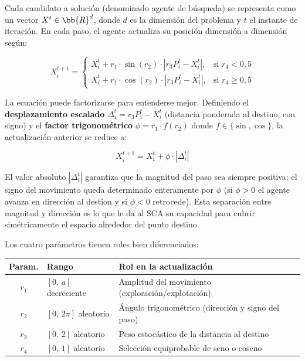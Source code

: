 \documentclass[12pt,a4paper]{article}
\begin{document}
Cada candidato a solución (denominado agente de búsqueda) se representa como un vector $X^t \in \bb{R}^d$, donde $d$ es la dimensión del problema y $t$ el instante de iteración. En cada paso, el agente actualiza su posición {dimensión a dimensión} según:

\begin{equation}
X_i^{t+1} =
\begin{cases}
X_i^t + r_1 \cdot \sin(r_2) \cdot \left| r_3 P_i^t - X_i^t \right|, & \text{si } r_4 < 0{,}5 \\[6pt]
X_i^t + r_1 \cdot \cos(r_2) \cdot \left| r_3 P_i^t - X_i^t \right|, & \text{si } r_4 \geq 0{,}5
\end{cases}
\label{eq:update}
\end{equation}

La ecuación puede factorizarse para entenderse mejor. Definiendo el \textbf{desplazamiento escalado} $\Delta_i^t = r_3 P_i^t - X_i^t$ (distancia ponderada al destino, con signo) y el \textbf{factor trigonométrico} $\phi = r_1 \cdot f(r_2)$ donde $f \in \{\sin, \cos\}$, la actualización anterior se reduce a:

\begin{equation}
X_i^{t+1} = X_i^t + \phi \cdot |\Delta_i^t|
\label{eq:factored}
\end{equation}

El valor absoluto $|\Delta_i^t|$ garantiza que la magnitud del paso sea siempre positiva; el {signo} del movimiento queda determinado enteramente por $\phi$ (si $\phi > 0$ el agente avanza en dirección al destion y si $\phi < 0$ retrocede). Esta separación entre magnitud y dirección es lo que le da al SCA su capacidad para cubrir simétricamente el espacio alrededor del punto destino.

Los cuatro parámetros tienen roles bien diferenciados:

\begin{center}
\begin{tabular}{c l l}
\toprule
\textbf{Param.} & \textbf{Rango} & \textbf{Rol en la actualización} \\
\midrule
$r_1$ & $[0,\,a]$ decreciente & Amplitud del movimiento (exploración/explotación) \\
$r_2$ & $[0,\,2\pi]$ aleatorio & Ángulo trigonométrico (dirección y signo del paso) \\
$r_3$ & $[0,\,2]$ aleatorio  & Peso estocástico de la distancia al destino \\
$r_4$ & $[0,\,1]$ aleatorio  & Selección equiprobable de seno o coseno \\
\bottomrule
\end{tabular}
\end{center}
\end{document}
